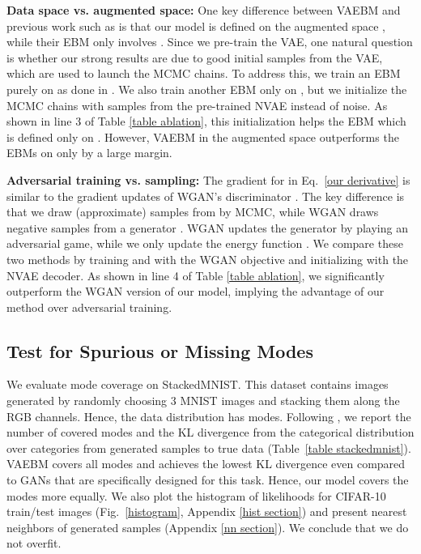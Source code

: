 \documentclass{article} \usepackage{iclr2021_conference,times}
\begin{document}
\textbf{Data space vs. augmented space:} One key difference between VAEBM and previous work such as \citet{du2019implicit} is that our model is defined on the augmented space , while their EBM only involves . Since we pre-train the VAE, one natural question is whether our strong results are due to good initial samples  from the VAE, which are used to launch the MCMC chains. To address this, we train an EBM purely on  as done in \citet{du2019implicit}. We also train another EBM only on , but we initialize the MCMC chains with samples from the pre-trained NVAE instead of noise. As shown in line 3 of Table \ref{table ablation}, this initialization helps the EBM which is defined only on . However, VAEBM in the augmented space outperforms the EBMs on  only by a large margin. 


\textbf{Adversarial training vs. sampling:} The gradient for  in Eq.~\ref{our derivative} is similar to the gradient updates of WGAN's discriminator \citep{arjovsky2017wasserstein}. The key difference is that we draw (approximate) samples from  by MCMC, while WGAN draws negative samples from a generator \citep{che2020your}. WGAN updates the generator by playing an adversarial game, while we only update the energy function . We compare these two methods by training  and  with the WGAN objective and initializing  with the NVAE decoder. As shown in line 4 of Table \ref{table ablation}, we significantly outperform the WGAN version of our model, implying the advantage of our method over adversarial training.





\subsection{Test for Spurious or Missing Modes}\label{mode}


We evaluate mode coverage on StackedMNIST. This dataset contains images generated by randomly choosing 3 MNIST images and stacking them along the RGB channels. Hence, the data distribution has  modes. Following \citet{lin2018pacgan}, we report the number of covered modes and the KL divergence from the categorical distribution over  categories from generated samples to true data (Table~\ref{table stackedmnist}). VAEBM covers all modes and achieves the lowest KL divergence even compared to GANs that are specifically designed for this task.
Hence, our model covers the modes more equally.
We also plot the histogram of likelihoods for CIFAR-10 train/test images (Fig.~\ref{histogram}, Appendix \ref{hist section}) and present nearest neighbors of generated samples (Appendix \ref{nn section}). We conclude that we do not overfit.
\end{document}
